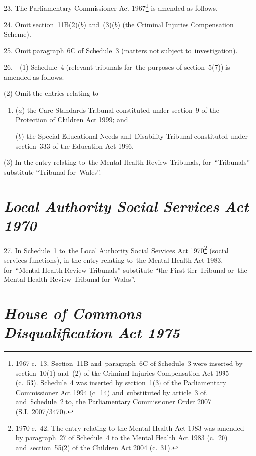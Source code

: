 \documentclass[12pt,a4paper]{article}
\begin{document}
23.  The Parliamentary Commissioner Act 1967\footnote{1967 c.~13. Section~11B and~paragraph~6C of Schedule~3 were inserted by section~10(1) and~(2) of the Criminal Injuries Compensation Act 1995 (c.~53). Schedule~4 was inserted by section~1(3) of the Parliamentary Commissioner Act 1994 (c.~14) and~substituted by article~3 of, and~Schedule~2 to, the Parliamentary Commissioner Order 2007 (S.I.~2007/3470).} is amended as follows.

\medskip

24.  Omit section~11B(2)($b$)  and~(3)($b$)  (the Criminal Injuries Compensation Scheme).

\medskip

25.  Omit paragraph~6C of Schedule~3 (matters not subject to~investigation).

\medskip

26.---(1)  Schedule~4 (relevant tribunals for~the purposes of section~5(7)) is amended as follows.

(2) Omit the entries relating to—
\begin{enumerate}\item[]
($a$) the Care Standards Tribunal constituted under section~9 of the Protection of Children Act 1999; and

($b$) the Special Educational Needs and~Disability Tribunal constituted under section~333 of the Education Act 1996.
\end{enumerate}

(3) In the entry relating to~the Mental Health Review Tribunals, for~“Tribunals” substitute “Tribunal for~Wales”.

\section*{\itshape Local Authority Social Services Act 1970}

27.  In Schedule~1 to~the Local Authority Social Services Act 1970\footnote{1970 c.~42. The entry relating to the Mental Health Act 1983 was amended by paragraph~27 of Schedule~4 to the Mental Health Act 1983 (c.~20) and~section~55(2) of the Children Act 2004 (c.~31).} (social services functions), in the entry relating to~the Mental Health Act 1983, for~“Mental Health Review Tribunals” substitute “the First-tier Tribunal or~the Mental Health Review Tribunal for~Wales”.

\section*{\itshape House of Commons Disqualification Act 1975}
\end{document}
